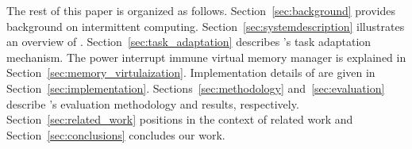 The rest of this paper is organized as follows. Section~\ref{sec:background} provides background on intermittent computing. Section~\ref{sec:systemdescription} illustrates an overview of \sys. Section~\ref{sec:task_adaptation} describes \sys's task adaptation mechanism. The power interrupt immune virtual memory manager is explained in Section~\ref{sec:memory_virtulaization}. Implementation details of \sys are given in Section~\ref{sec:implementation}. Sections~\ref{sec:methodology} and~\ref{sec:evaluation} describe \sys's evaluation methodology and results, respectively. Section~\ref{sec:related_work} positions \sys in the context of related work and Section~\ref{sec:conclusions} concludes our work.
